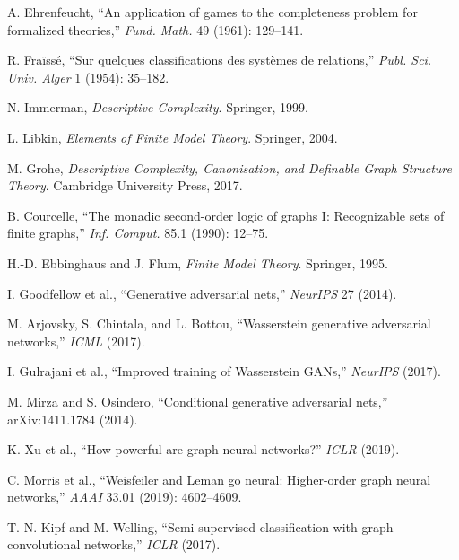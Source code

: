 \documentclass{article}
\begin{document}
\begin{thebibliography}{99}

 A. Ehrenfeucht, ``An application of games to the completeness problem for formalized theories,'' \emph{Fund. Math.} 49 (1961): 129--141.

 R. Fra\"iss\'e, ``Sur quelques classifications des syst\`emes de relations,'' \emph{Publ. Sci. Univ. Alger} 1 (1954): 35--182.

 N. Immerman, \emph{Descriptive Complexity}. Springer, 1999.

 L. Libkin, \emph{Elements of Finite Model Theory}. Springer, 2004.

 M. Grohe, \emph{Descriptive Complexity, Canonisation, and Definable Graph Structure Theory}. Cambridge University Press, 2017.

 B. Courcelle, ``The monadic second-order logic of graphs I: Recognizable sets of finite graphs,'' \emph{Inf. Comput.} 85.1 (1990): 12--75.

 H.-D. Ebbinghaus and J. Flum, \emph{Finite Model Theory}. Springer, 1995.

 I. Goodfellow et al., ``Generative adversarial nets,'' \emph{NeurIPS} 27 (2014).

 M. Arjovsky, S. Chintala, and L. Bottou, ``Wasserstein generative adversarial networks,'' \emph{ICML} (2017).

 I. Gulrajani et al., ``Improved training of Wasserstein GANs,'' \emph{NeurIPS} (2017).

 M. Mirza and S. Osindero, ``Conditional generative adversarial nets,'' arXiv:1411.1784 (2014).

 K. Xu et al., ``How powerful are graph neural networks?'' \emph{ICLR} (2019).

 C. Morris et al., ``Weisfeiler and Leman go neural: Higher-order graph neural networks,'' \emph{AAAI} 33.01 (2019): 4602--4609.

 T. N. Kipf and M. Welling, ``Semi-supervised classification with graph convolutional networks,'' \emph{ICLR} (2017).


\end{thebibliography}
\end{document}
